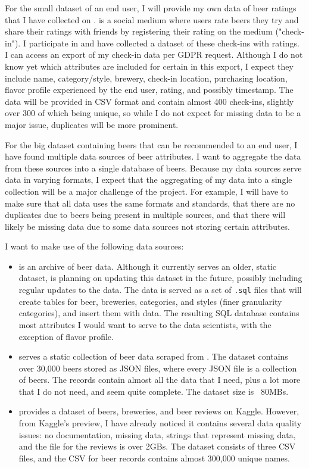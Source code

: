 \documentclass[sigconf, natbib=true]{acmart}
\begin{document}
For the small dataset of an end user, I will provide my own data of beer ratings that I have collected on \citeauthor{untappd}.
\citet{untappd} is a social medium where users rate beers they try and share their ratings with friends by registering their rating on the medium ("check-in").
I participate in \citeauthor{untappd} and have collected a dataset of these check-ins with ratings.
I can access an export of my check-in data per GDPR request.
Although I do not know yet which attributes are included for certain in this export, I expect they include name, category/style, brewery, check-in location, purchasing location, flavor profile experienced by the end user, rating, and possibly timestamp.
The data will be provided in CSV format and contain almost 400 check-ins, slightly over 300 of which being unique, so while I do not expect for missing data to be a major issue, duplicates will be more prominent.

For the big dataset containing beers that can be recommended to an end user, I have found multiple data sources of beer attributes.
I want to aggregate the data from these sources into a single database of beers. 
Because my data sources serve data in varying formats, I expect that the aggregating of my data into a single collection will be a major challenge of the project.
For example, I will have to make sure that all data uses the same formats and standards, that there are no duplicates due to beers being present in multiple sources, and that there will likely be missing data due to some data sources not storing certain attributes.

I want to make use of the following data sources:
\begin{itemize}
    \item \citet{openbeerdb} is an archive of beer data.
    Although it currently serves an older, static dataset, \citeauthor{openbeerdb} is planning on updating this dataset in the future, possibly including regular updates to the data.
    The \citeauthor{openbeerdb} data is served as a set of \texttt{.sql} files that will create tables for beer, breweries, categories, and styles (finer granularity categories), and insert them with data.
    The resulting SQL database contains most attributes I would want to serve to the data scientists, with the exception of flavor profile.
    \item \citet{philipperemy} serves a static collection of beer data scraped from \citet{brewerydb}.
    The dataset contains over 30,000 beers stored as JSON files, where every JSON file is a collection of beers.
    The records contain almost all the data that I need, plus a lot more that I do not need, and seem quite complete.
    The dataset size is ~80MBs.
    \item \citet{evanhallmark} provides a dataset of beers, breweries, and beer reviews on Kaggle.
    However, from Kaggle's preview, I have already noticed it contains several data quality issues: no documentation, missing data, strings that represent missing data, and the file for the reviews is over 2GBs.
    The dataset consists of three CSV files, and the CSV for beer records contains almost 300,000 unique names.
\end{itemize}
\end{document}
